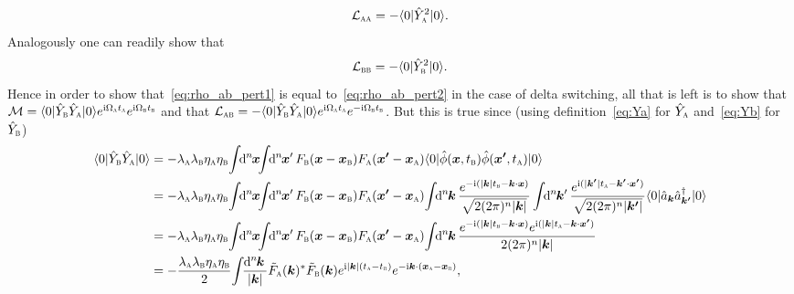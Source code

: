 \documentclass[pra,nofootinbib,floats,aps,twocolumn,tightenlines,superscriptaddress]{revtex4-1}
\renewcommand*\d[2][]{%
	\mathrm{d}%
	\ifx\relax#1\relax\else
	\rule{-0.02em}{1.5ex}^{#1}\rule{0.08em}{0ex}\!
	\fi
	#2\,
}
\newcommand{\ket}[1]{| {#1} \rangle}
\newcommand{\bra}[1]{\langle {#1} |}
\newcommand{\ii}{\mathrm{i}}
\renewcommand{\a}[1]{\hat{a}_{\bm{#1}}}
\newcommand{\ad}[1]{\hat{a}_{\bm{#1}}^\dagger}
\newcommand{\Ya}{\hat{Y}_\textsc{a}}
\newcommand{\Yb}{\hat{Y}_\textsc{b}}
\begin{document}
\begin{equation}
    \mathcal{L}_\textsc{aa}
    =
    -\bra{0}\Ya^2\ket{0}.
\end{equation}
Analogously one can readily show that
\begin{equation}
    \mathcal{L}_\textsc{bb}
    =
    -\bra{0}\Yb^2\ket{0}.
\end{equation}
Hence in order to show that~\eqref{eq:rho_ab_pert1} is equal to~\eqref{eq:rho_ab_pert2} in the case of delta switching, all that is left is to show that \mbox{$\mathcal{M}=\bra{0}\Yb\Ya\ket{0}e^{\ii\Omega_\textsc{a}t_\textsc{a}}e^{\ii\Omega_\textsc{b}t_\textsc{b}}$} and that \mbox{$\mathcal{L}_\textsc{ab}=-\bra{0}\Yb\Ya\ket{0}e^{\ii\Omega_\textsc{a}t_\textsc{a}}e^{-\ii\Omega_\textsc{b}t_\textsc{b}}$}. But this is true since (using definition~\eqref{eq:Ya} for $\Ya$ and~\eqref{eq:Yb} for $\Yb$)
\begin{align}
    \bra{0}\Yb\Ya\ket{0}
    &=
    -\lambda_\textsc{a}
    \lambda_\textsc{b}
    \eta_\textsc{a}
    \eta_\textsc{b}
    \!\int\!\!\d[n]{\bm x}\!\!\!
    \int\!\!\d[n]{\bm x'}
    F_\textsc{b}(\bm{x}-\bm{x}_\textsc{b})
    F_\textsc{a}(\bm{x'}-\bm{x}_\textsc{a})
    \bra{0}
    \hat{\phi}(\bm{x},t_\textsc{b})
    \hat{\phi}(\bm{x'},t_\textsc{a})
    \ket{0}
    \notag\\
    &=
    -\lambda_\textsc{a}
    \lambda_\textsc{b}
    \eta_\textsc{a}
    \eta_\textsc{b}
    \!\int\!\!\d[n]{\bm x}\!\!\!
    \int\!\!\d[n]{\bm x'}
    F_\textsc{b}(\bm{x}-\bm{x}_\textsc{b})
    F_\textsc{a}(\bm{x'}-\bm{x}_\textsc{a})
    \!\int\!\!
    \d[n]{\bm k}
    \frac{e^{-\ii(|\bm{k}|t_\textsc{b}-\bm{k}\cdot\bm{x})}}{\sqrt{2(2\pi)^n|\bm{k}|}}
    \int\!\!
    \d[n]{\bm k'}
    \frac{e^{\ii(|\bm{k'}|t_\textsc{a}-\bm{k'}\cdot\bm{x'})}}{\sqrt{2(2\pi)^n|\bm{k'}|}}
    \bra{0}\a{k}\ad{k'}\ket{0}
    \notag\\
    &=
    -\lambda_\textsc{a}
    \lambda_\textsc{b}
    \eta_\textsc{a}
    \eta_\textsc{b}
    \!\int\!\!\d[n]{\bm x}\!\!\!
    \int\!\!\d[n]{\bm x'}
    F_\textsc{b}(\bm{x}-\bm{x}_\textsc{b})
    F_\textsc{a}(\bm{x'}-\bm{x}_\textsc{a})
    \!\int\!\!
    \d[n]{\bm k}
    \frac{ e^{-\ii(|\bm{k}|t_\textsc{b}-\bm{k}\cdot\bm{x})} e^{\ii(|\bm{k}|t_\textsc{a}-\bm{k}\cdot\bm{x'})}}{2(2\pi)^n|\bm{k}|}
    \notag\\
    &=
    -\frac{\lambda_\textsc{a}
    \lambda_\textsc{b}
    \eta_\textsc{a}
    \eta_\textsc{b}}{2}
    \!\int\!\!
    \frac{\d[n]{\bm k}}{|\bm{k}|}
    \tilde{F}_\textsc{a}(\bm k)^*
    \tilde{F}_\textsc{b}(\bm k)
    e^{\ii|\bm{k}|(t_\textsc{a}-t_\textsc{b})}
    e^{-\ii\bm{k}\cdot(\bm{x}_\textsc{a}-\bm{x}_\textsc{b})}
    ,
\end{align}
\end{document}
